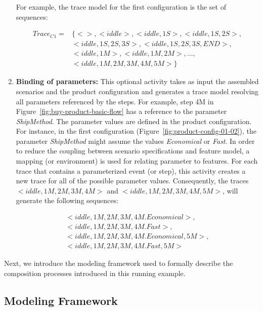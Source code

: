 \documentclass{llncs}
\begin{document}
\begin{enumerate}
For example, the trace model for the first configuration is the set of sequences:

\begin{small}
\begin{eqnarray*}
Trace_{C1} = & \{<>, <iddle>, <iddle, 1S>, <iddle, 1S,2S>, \\ 
                    & <iddle,1S,2S,3S>,  <iddle,1S,2S,3S,END>, \\ 
                    & <iddle, 1M>, <iddle, 1M,2M>, \ldots, \\ 
                    & <iddle, 1M, 2M,3M,4M,5M> \}
\end{eqnarray*}
\end{small}
 
 \item {\bf Binding of parameters:}  This optional activity takes as input the assembled scenarios and the product configuration and generates 
 a trace model resolving all parameters referenced by the steps. For example, step 4M in Figure~\ref{fig:buy-product-basic-flow} has a reference 
 to the parameter \emph{ShipMethod}. The parameter values are defined in the product configuration. For instance, in the 
 first configuration (Figure~\ref{fig:product-config-01-02}), the parameter \emph{ShipMethod} might assume the values \emph{Economical} or 
 \emph{Fast}. In order to reduce the coupling between scenario specifications and feature model, a mapping (or environment) is used for relating 
 parameter to features. For each trace that contains a parameterized event (or step), this activity creates a new trace for all of the possible parameter 
 values. Consequently, the traces $<iddle,1M,2M,3M,4M>$ and $<iddle, 1M, 2M, 3M, 4M, 5M>$, will generate the following sequences:
 
\begin{small}
\begin{eqnarray*}
<iddle,1M,2M,3M,4M.Economical>, \\ <iddle,1M,2M,3M,4M.Fast>, \\
<iddle,1M,2M,3M,4M.Economical,5M>, \\ <iddle,1M,2M,3M,4M.Fast, 5M>
\end{eqnarray*}
\end{small}
 
\end{enumerate}

Next, we introduce the modeling framework used to formally describe the composition processes introduced in this running example. 

\subsection{Modeling Framework}
\end{document}
